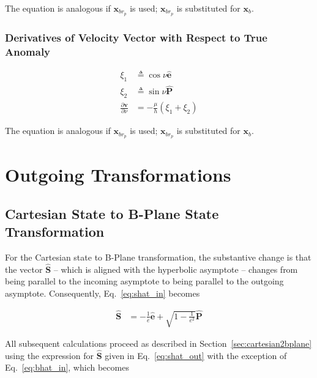 \documentclass[]{article}
\newcommand{\vb}[1]{\bm{#1}} %
\newcommand{\vbh}[1]{\hat{\bm{#1}}} %
\newcommand{\pd}[2]{\frac{\partial #1}{\partial #2}} %
\newcommand{\xb}[0]{\vb{x}_b}
\newcommand{\xbrp}[0]{\vb{x}_{br_p}}
\begin{document}
The equation is analogous if $\xbrp$ is used; $\xbrp$ is substituted for $\xb$.

\subsubsection{Derivatives of Velocity Vector with Respect to True Anomaly}

\begin{align}
\xi_1 &\triangleq \cos{\nu} \vbh{e} \\
\xi_2 &\triangleq \sin{\nu} \vbh{P} \\
\pd{\vb{v}}{\nu} &= -\frac{\mu}{h} \left( \xi_1 + \xi_2 \right)
\end{align}

The equation is analogous if $\xbrp$ is used; $\xbrp$ is substituted for $\xb$.

\section{Outgoing Transformations}
\label{sec:outgoing_transformations}

\subsection{Cartesian State to B-Plane State Transformation}
\label{sec:cartesian2bplane_outgoing}

For the Cartesian state to B-Plane transformation, the substantive change is that the vector $\vbh{S}$ -- which is aligned with the hyperbolic asymptote -- changes from being parallel to the incoming asymptote to being parallel to the outgoing asymptote. Consequently, Eq.~\eqref{eq:shat_in} becomes

\begin{align}
	\label{eq:shat_out}
	\vbh{S} &= -\frac{1}{e} \vbh{e} + \sqrt{1 - \frac{1}{e^2}} \vbh{P}
\end{align}

All subsequent calculations proceed as described in Section~\ref{sec:cartesian2bplane} using the expression for $\vbh{S}$ given in Eq.~\eqref{eq:shat_out} with the exception of Eq.~\eqref{eq:bhat_in}, which becomes
\end{document}
